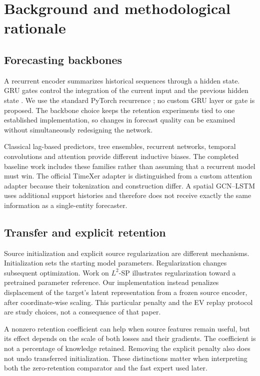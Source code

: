 \documentclass[pdflatex,iicol,sn-mathphys-num]{sn-jnl}
\begin{document}
\section{Background and methodological rationale}
\subsection{Forecasting backbones}
A recurrent encoder summarizes historical sequences through a hidden state. GRU gates control the integration of the current input and the previous hidden state \cite{cho2014}. We use the standard PyTorch recurrence \cite{pytorch211}; no custom GRU layer or gate is proposed. The backbone choice keeps the retention experiments tied to one established implementation, so changes in forecast quality can be examined without simultaneously redesigning the network.

Classical lag-based predictors, tree ensembles, recurrent networks, temporal convolutions and attention provide different inductive biases. The completed baseline work includes these families rather than assuming that a recurrent model must win. The official TimeXer adapter \cite{wang2024timexer} is distinguished from a custom attention adapter because their tokenization and construction differ. A spatial GCN--LSTM uses additional support histories and therefore does not receive exactly the same information as a single-entity forecaster.

\subsection{Transfer and explicit retention}
Source initialization and explicit source regularization are different mechanisms. Initialization sets the starting model parameters. Regularization changes subsequent optimization. Work on $L^2$-SP \cite{li2018} illustrates regularization toward a pretrained parameter reference. Our implementation instead penalizes displacement of the target's latent representation from a frozen source encoder, after coordinate-wise scaling. This particular penalty and the EV replay protocol are study choices, not a consequence of that paper.

A nonzero retention coefficient can help when source features remain useful, but its effect depends on the scale of both losses and their gradients. The coefficient is not a percentage of knowledge retained. Removing the explicit penalty also does not undo transferred initialization. These distinctions matter when interpreting both the zero-retention comparator and the fast expert used later.
\end{document}
